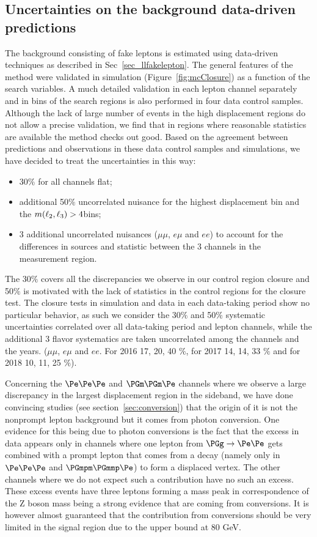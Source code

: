 \subsection{Uncertainties on the background data-driven predictions}
The background consisting of fake leptons is estimated
using data-driven techniques as described in
Sec~\ref{sec_llfakelepton}. The general features of the method were
validated in simulation (Figure~\ref{fig:mcClosure}) as a function of
the search variables. A much detailed validation in each lepton
channel separately and in bins of the search regions is also performed
in four data control samples. Although the lack of large number of events in the high displacement regions do not allow a precise validation, we find that in regions where reasonable statistics are available the method checks out good. 
Based on the agreement between predictions and observations in these data control samples and simulations, we have decided to treat the uncertainties in this way:
\begin{itemize}
\setlength\itemsep{-0.2em}
\item 30$\%$ for all channels flat;
\item additional 50$\%$ uncorrelated nuisance for the highest displacement bin and the $m(\ell_2,\ell_3) > 4$\GeV bins;
\item 3 additional uncorrelated nuisances ($\mu\mu$, $e\mu$ and $ee$) to account for the differences in sources and statistic between the 3 channels in the \Dfr measurement region.
\end{itemize}
The 30$\%$ covers all the discrepancies we observe in our control region closure and 50$\%$ is motivated with the lack of statistics in the control regions for the closure test. 
The closure tests in simulation and data in each data-taking period show no particular behavior, as such we consider the 30$\%$ and 50$\%$ systematic uncertainties correlated over all data-taking period and lepton channels, while the additional 3 flavor systematics are taken uncorrelated among the channels and the years. ($\mu\mu$, $e\mu$ and $ee$. For 2016 17, 20, 40 $\%$, for 2017 14, 14, 33 $\%$ and for 2018 10, 11, 25 $\%$).

Concerning the $\Pe\Pe\Pe$ and $\PGm\PGm\Pe$ channels where we observe
a large discrepancy in the largest displacement region in the
sideband, we have done convincing studies (see
section~\ref{sec:conversion}) that the origin of it is not the
nonprompt lepton background but it comes from photon conversion. One
evidence for this being due to photon conversions is the fact that the
excess in data appears only in channels where one lepton from
$\PGg\to\Pe\Pe$ gets combined with a prompt lepton that comes from a
\PZ decay (namely only in $\Pe\Pe\Pe$ and $\PGmpm\PGmmp\Pe$) to form a
displaced vertex. The other channels where we do not expect such a
contribution have no such an excess. These excess events have
three leptons forming a mass peak in correspondence
of the Z boson mass being a strong evidence that are coming from conversions. It is however almost guaranteed that  the contribution from conversions should be very limited in the signal region due to the \mlll upper bound at 80 GeV. 


